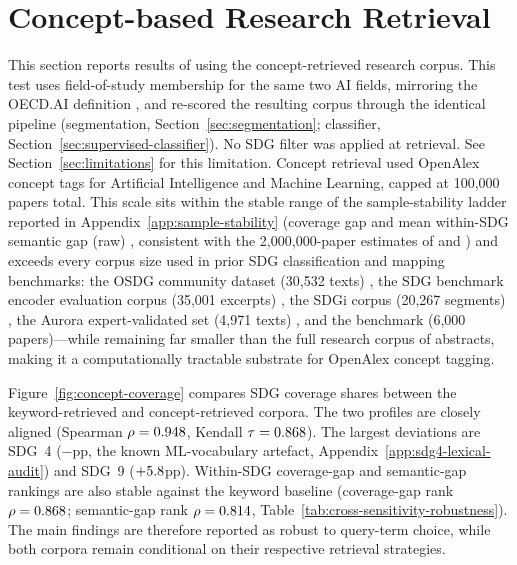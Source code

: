 \documentclass[12pt,a4paper]{article}
\let\OldSection\section
\renewcommand{\section}{\clearpage\FloatBarrier\OldSection}
\begin{document}
\section{Concept-based Research Retrieval}
\label{app:concept-retrieval-sensitivity}

This section reports results of using the concept-retrieved research corpus. This test uses field-of-study membership for the same two AI fields, mirroring the OECD.AI definition \parencite{OECDAiMethod}, and re-scored the resulting corpus through the identical pipeline (segmentation, Section~\ref{sec:segmentation}; classifier, Section~\ref{sec:supervised-classifier}). No SDG filter was applied at retrieval. See Section~\ref{sec:limitations} for this limitation. Concept retrieval used OpenAlex concept tags for Artificial Intelligence and Machine Learning, capped at 100{,}000 papers total. This scale sits within the stable range of the sample-stability ladder reported in Appendix~\ref{app:sample-stability} (coverage gap \SampleCoverageGapFiftyK{} and mean within-SDG semantic gap (raw) \SampleMeanSemanticGapFiftyK{}, consistent with the 2{,}000{,}000-paper estimates of \SampleCoverageGapTwoM{} and \SampleMeanSemanticGapTwoM{}) and exceeds every corpus size used in prior SDG classification and mapping benchmarks: the OSDG community dataset (30,532 texts) \parencite{Pukelis2022}, the SDG benchmark encoder evaluation corpus (35,001 excerpts) \parencite{Gjorgjevikj2025}, the SDGi corpus (20,267 segments) \parencite{SDGi2024}, the Aurora expert-validated set (4,971 texts) \parencite{Vanderfeesten2020Aurora}, and the \textcite{Kashnitsky2024} benchmark (6,000 papers)---while remaining far smaller than the full research corpus of \NResearchAbstracts{} abstracts, making it a computationally tractable substrate for OpenAlex concept tagging.

Figure~\ref{fig:concept-coverage} compares SDG coverage shares between the keyword-retrieved and concept-retrieved corpora. The two profiles are closely aligned (Spearman $\rho = 0.948$, Kendall $\tau = 0.868$). The largest deviations are SDG~4 ($-$\ConceptCoverageMaxAbsDelta{}pp, the known ML-vocabulary artefact, Appendix~\ref{app:sdg4-lexical-audit}) and SDG~9 ($+5.8$pp). Within-SDG coverage-gap and semantic-gap rankings are also stable against the keyword baseline (coverage-gap rank $\rho = 0.868$; semantic-gap rank $\rho = 0.814$, Table~\ref{tab:cross-sensitivity-robustness}). The main findings are therefore reported as robust to query-term choice, while both corpora remain conditional on their respective retrieval strategies.
\end{document}
